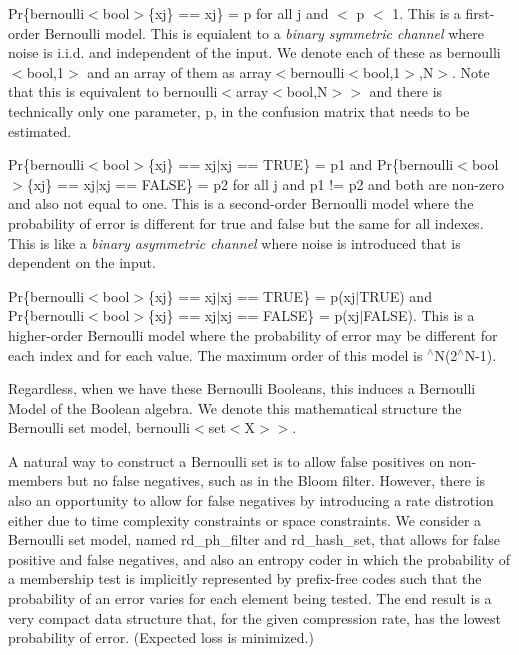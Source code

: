 \begin{DoxyEnumerate}
\item {\ttfamily Pr\{bernoulli$<$bool$>$\{xj\} == xj\} = p} for all {\ttfamily j} and { $<$ p $<$ 1}. This is a first-\/order Bernoulli model. This is equialent to a {\itshape binary symmetric channel} where noise is i.\+i.\+d. and independent of the input. We denote each of these as {\ttfamily bernoulli$<$bool,1$>$} and an array of them as {\ttfamily array$<$bernoulli$<$bool,1$>$,N$>$}. Note that this is equivalent to {\ttfamily bernoulli$<$array$<$bool,N$>$$>$} and there is technically only one parameter, {\ttfamily p}, in the confusion matrix that needs to be estimated.
\item {\ttfamily Pr\{bernoulli$<$bool$>$\{xj\} == xj$\vert$xj == TRUE\} = p1} and {\ttfamily Pr\{bernoulli$<$bool$>$\{xj\} == xj$\vert$xj == FALSE\} = p2} for all {\ttfamily j} and {\ttfamily p1 != p2} and both are non-\/zero and also not equal to one. This is a second-\/order Bernoulli model where the probability of error is different for {\ttfamily true} and {\ttfamily false} but the same for all indexes. This is like a {\itshape binary asymmetric channel} where noise is introduced that is dependent on the input.
\item {\ttfamily Pr\{bernoulli$<$bool$>$\{xj\} == xj$\vert$xj == TRUE\} = p(xj$\vert$\+TRUE)} and {\ttfamily Pr\{bernoulli$<$bool$>$\{xj\} == xj$\vert$xj == FALSE\} = p(xj$\vert$\+FALSE)}. This is a higher-\/order Bernoulli model where the probability of error may be different for each index and for each value. The maximum order of this model is {$^\wedge$N(2$^\wedge$\+N-\/1)}.
\end{DoxyEnumerate}

Regardless, when we have these Bernoulli Booleans, this induces a Bernoulli Model of the Boolean algebra. We denote this mathematical structure the Bernoulli set model, {\ttfamily bernoulli$<$set$<$X$>$$>$}.

A natural way to construct a Bernoulli set is to allow false positives on non-\/members but no false negatives, such as in the Bloom filter. However, there is also an opportunity to allow for false negatives by introducing a rate distrotion either due to time complexity constraints or space constraints. We consider a Bernoulli set model, named {\ttfamily rd\+\_\+ph\+\_\+filter} and {\ttfamily rd\+\_\+hash\+\_\+set}, that allows for false positive and false negatives, and also an entropy coder in which the probability of a membership test is implicitly represented by prefix-\/free codes such that the probability of an error varies for each element being tested. The end result is a very compact data structure that, for the given compression rate, has the lowest probability of error. (Expected loss is minimized.)

